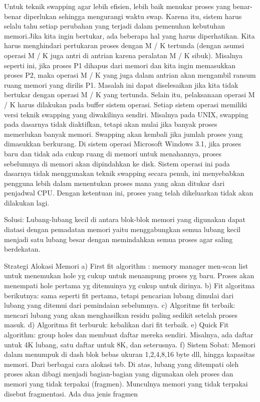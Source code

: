 Untuk teknik swapping agar lebih efisien, lebih baik menukar proses yang benar-benar diperlukan sehingga mengurangi waktu swap. Karena itu, sistem harus selalu tahu setiap perubahan yang terjadi dalam pemenuhan kebutuhan memori.Jika kita ingin bertukar, ada beberapa hal yang harus diperhatikan. Kita harus menghindari pertukaran proses dengan M / K tertunda (dengan asumsi operasi M / K juga antri di antrian karena peralatan M / K sibuk). Misalnya seperti ini, jika proses P1 dihapus dari memori dan kita ingin memasukkan proses P2, maka operasi M / K yang juga dalam antrian akan mengambil ransum ruang memori yang dirilis P1. Masalah ini dapat diselesaikan jika kita tidak bertukar dengan operasi M / K yang tertunda. Selain itu, pelaksanaan operasi M / K harus dilakukan pada buffer sistem operasi.
Setiap sistem operasi memiliki versi teknik swapping yang diwakilinya sendiri. Misalnya pada UNIX, swapping pada dasarnya tidak diaktifkan, tetapi akan mulai jika banyak proses memerlukan banyak memori. Swapping akan kembali jika jumlah proses yang dimasukkan berkurang. Di sistem operasi Microsoft Windows 3.1, jika proses baru dan tidak ada cukup ruang di memori untuk menahannya, proses sebelumnya di memori akan dipindahkan ke disk. Sistem operasi ini pada dasarnya tidak menggunakan teknik swapping secara penuh, ini menyebabkan pengguna lebih dalam menentukan proses mana yang akan ditukar dari penjadwal CPU. Dengan ketentuan ini, proses yang telah dikeluarkan tidak akan dilakukan lagi.

{Solusi}:
Lubang-lubang kecil di antara blok-blok memori yang digunakan dapat diatasi dengan pemadatan memori yaitu menggabungkan semua lubang kecil menjadi satu lubang besar dengan memindahkan semua proses agar saling berdekatan.
 
Strategi Alokasi Memori
a) First fit algorithm : memory  manager men-scan list untuk  menemukan hole yg cukup untuk menampung proses yg baru. Proses akan menempati hole pertama yg ditemuinya yg cukup untuk dirinya.
b) Fit algoritma berikutnya: sama seperti fit pertama, tetapi pencarian lubang dimulai dari lubang yang ditemui dari pemindaian sebelumnya.
c) Algoritme fit terbaik: mencari lubang yang akan menghasilkan residu paling sedikit setelah proses masuk.
d) Algoritma fit terburuk: kebalikan dari fit terbaik.
e) Quick Fit algorithm: group holes dan membuat daftar mereka sendiri. Misalnya, ada daftar untuk 4K lubang, satu daftar untuk 8K, dan seterusnya.
f) Sistem Sobat: Memori dalam menumpuk di dash blok bebas ukuran 1,2,4,8,16 byte dll, hingga kapasitas memori.
Dari berbagai cara alokasi tsb. Di atas, lubang yang ditempati oleh proses akan dibagi menjadi bagian-bagian yang digunakan oleh proses dan memori yang tidak terpakai (fragmen). Munculnya memori yang tidak terpakai disebut fragmentasi. Ada dua jenis fragmen
